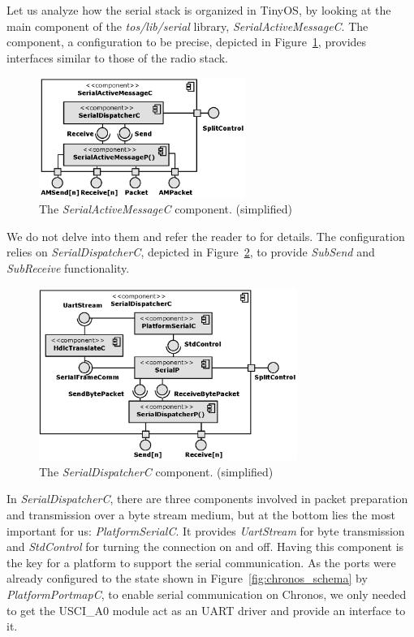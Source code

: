 Let us analyze how the serial stack is organized in TinyOS, by looking at the main component of the \emph{tos/lib/serial} library, \emph{SerialActiveMessageC}. The component, a configuration to be precise, depicted in Figure~\ref{fig:serial_active_message_c}, provides interfaces  similar to those of the radio stack.
\begin{figure}[h]
  \centering
  \includegraphics[width=0.6\textwidth]{diagrams/serial_active_message_c.eps}
  \caption{The \emph{SerialActiveMessageC} component. (simplified)}
  \label{fig:serial_active_message_c}
\end{figure}
We do not delve into them and refer the reader to \cite{TEP113} for details. The configuration relies on \emph{SerialDispatcherC}, depicted in Figure~\ref{fig:serial_dispatcher_c}, to provide \emph{SubSend} and \emph{SubReceive} functionality.
\begin{figure}[h]
  \centering
  \includegraphics[width=0.75\textwidth]{diagrams/serial_dispatcher_c.eps}
  \caption{The \emph{SerialDispatcherC} component. (simplified)}
  \label{fig:serial_dispatcher_c}
\end{figure}
In \emph{SerialDispatcherC}, there are three components involved in packet preparation and transmission over a byte stream medium, but at the bottom lies the most important for us: \emph{PlatformSerialC}. It provides \emph{UartStream} for byte transmission and \emph{StdControl} for turning the connection on and off. Having this component is the key for a platform to support the serial communication. As the ports were already configured to the state shown in Figure~\ref{fig:chronos_schema} by \emph{PlatformPortmapC}, to enable serial communication on Chronos, we only needed to get the USCI\_A0 module act as an UART driver and provide an interface to it.

